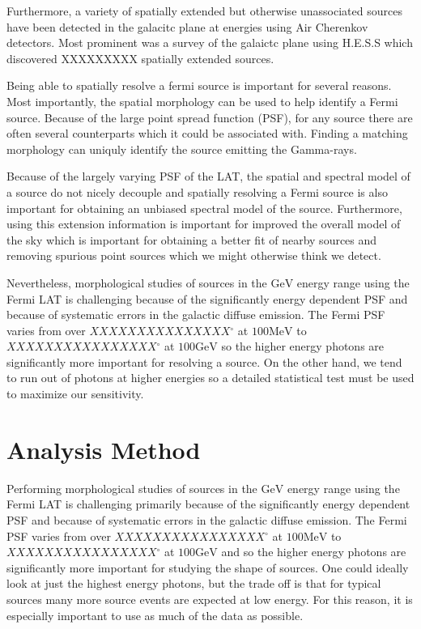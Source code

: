 \documentclass[preprint]{aastex}
\newcommand{\mev}{\text{MeV}\xspace}
\newcommand{\gev}{\text{GeV}\xspace}
\newcommand{\tev}{\text{TeV}\xspace}
\renewcommand{\deg}{\ensuremath{^\circ}\xspace}
\begin{document}
Furthermore, a variety of spatially extended but otherwise unassociated
sources have been detected in the galacitc plane at \tev energies using
Air Cherenkov detectors. Most prominent was a survey of the galaictc
plane using H.E.S.S which discovered XXXXXXXXX spatially extended
sources\cite{HESS_plane_survey}.

Being able to spatially resolve a fermi source is important for several
reasons. Most importantly, the spatial morphology can be used to help
identify a Fermi source. Because of the large point spread function (PSF),
for any source there are often several counterparts which it could be
associated with. Finding a matching morphology can uniquly identify the
source emitting the Gamma-rays. 

Because of the largely varying PSF of the LAT, the
spatial and spectral model of a source do not nicely decouple and
spatially resolving a Fermi source is also important for obtaining an
unbiased spectral model of the source.  Furthermore, using this extension
information is important for improved the overall model of the sky which
is important for obtaining a better fit of nearby sources and removing
spurious point sources which we might otherwise think we detect.


Nevertheless, morphological studies of sources in the $\gev$ energy range using
the Fermi LAT is challenging because of the significantly energy
dependent PSF and because of systematic errors in the
galactic diffuse emission. The Fermi PSF varies from over $XXXXXXXXXXXXXXX\deg$
at $100\mev$ to $XXXXXXXXXXXXXXXX\deg$ at $100\gev$ so the higher energy photons 
are significantly more important for resolving a source. On the other hand, 
we tend to run out of photons at higher energies so a detailed statistical 
test must be used to maximize our sensitivity.

\section{Analysis Method}


%

Performing morphological studies of sources in the $\gev$ energy range using
the Fermi LAT is challenging primarily because of the significantly energy
dependent PSF and because of systematic errors in the
galactic diffuse emission. The Fermi PSF varies from over $XXXXXXXXXXXXXXXX\deg$
at $100\mev$ to $XXXXXXXXXXXXXXXX\deg$ at $100\gev$ and so the higher energy photons are
significantly more important for studying the shape of sources. One could
ideally look at just the highest energy photons, but the trade off is that
for typical sources many more source events are expected at low energy.
For this reason, it is especially important to use as much of the data
as possible.
\end{document}
